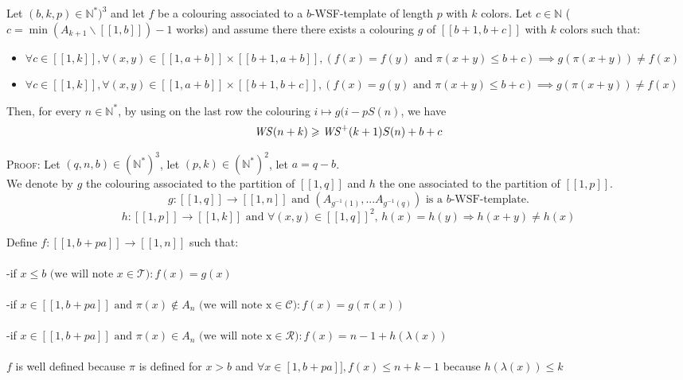 \begin{proposition}
Let \((b, k, p) \in \mathbb{N}^*)^3\) and let \(f\) be a colouring associated to a \(b\)-WSF-template of length \(p\) with \(k\) colors. Let
\(c \in \mathbb{N}\) (\(c = \min (A_{k+1} \backslash [\![1, b ]\!]) - 1\) works) and assume there there exists a colouring \(g\) of
\([\![b + 1, b + c]\!]\) with \(k\) colors such that:
\begin{itemize}
	\item \(\forall c \in [\![1, k]\!], \forall (x, y) \in  [\![1, a + b]\!] \times  [\![b + 1, a + b]\!], (f(x) = f(y) \text{ and } \pi(x + y) \leqslant b + c)
	\implies g(\pi(x + y)) \neq f(x)\)
	\item \(\forall c \in [\![1, k]\!], \forall (x, y) \in  [\![1, a + b]\!] \times  [\![b + 1, b + c]\!],  (f(x) = g(y) \text{ and } \pi(x + y) \leqslant b + c)
\implies g(\pi(x + y)) \neq f(x)\)
\end{itemize}
Then, for every \(n \in \mathbb{N}^*\), by using on the last row the colouring \(i \longmapsto g(i - p S(n)\), we have\\
\[ \mathit{WS}(n+k) \geqslant \mathit{WS}^+(k+1) S(n) + b + c\]
\end{proposition}

\textsc{Proof:} Let \((q,n,b) \in (\mathbb{N}^*)^3\), let \( (p,k) \in (\mathbb{N}^*)^2\), let \(a=q-b\). \\
We denote by \(g\) the colouring associated to the partition of \([\![1,q]\!]\) and \(h\) the
one associated to the partition of \([\![1,p]\!]\).
\[ g : [\![1,q]\!] \longrightarrow [\![1,n]\!] \text{ and } (A_{g^{-1}(1)},...A_{g^{-1}(q)})\text{ is a \(b\)-WSF-template.}
\]
\[h : [\![1,p]\!] \longrightarrow [\![1,k]\!] \text{ and } \forall (x,y) \in [\![1,q]\!]^2 \text{, } h(x) = h(y)
\Longrightarrow h(x+y) \neq h(x)
\]

Define \( f : [\![1,b+pa]\!] \longrightarrow [\![1,n]\!] \) such that:
\\\\-if  \(x\leqslant b \text{ (we will note }x \in \mathcal{T}): f(x)=g(x)\)
\\\\-if \( x \in [\![1,b+pa]\!] \text{ and } \pi(x) \notin A_n \text{ (we will note x} \in \mathcal{C}): f(x)=g(\pi(x))\)
\\\\-if \( x \in [\![1,b+pa]\!]  \text{ and }\pi(x) \in A_n \text{ (we will note x} \in \mathcal{R}): f(x)=n-1+h(\lambda(x))\)
\\\\
\(f\) is well defined because \(\pi\) is defined for \(x>b\) and \(\forall x \in \![1,b+pa]\!], f(x)\leqslant n+k-1\) because \(h(\lambda(x))\leqslant k\)

